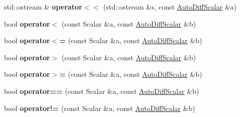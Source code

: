 \begin{DoxyCompactItemize}
\item 
\mbox{\label{class_eigen_1_1_auto_diff_scalar_aaa3efe607e0e4cac21c7ccb1d0f5f800}} 
std\+::ostream \& {\bfseries operator$<$$<$} (std\+::ostream \&s, const \hyperlink{class_eigen_1_1_auto_diff_scalar}{Auto\+Diff\+Scalar} \&a)
\item 
\mbox{\label{class_eigen_1_1_auto_diff_scalar_a7f329201c1c6671fa0bd1aaa1be0e30b}} 
bool {\bfseries operator$<$} (const Scalar \&a, const \hyperlink{class_eigen_1_1_auto_diff_scalar}{Auto\+Diff\+Scalar} \&b)
\item 
\mbox{\label{class_eigen_1_1_auto_diff_scalar_adbe3f187ba731644689b7908c1edbe22}} 
bool {\bfseries operator$<$=} (const Scalar \&a, const \hyperlink{class_eigen_1_1_auto_diff_scalar}{Auto\+Diff\+Scalar} \&b)
\item 
\mbox{\label{class_eigen_1_1_auto_diff_scalar_abf6b293bf812336bd22db1a4d1894751}} 
bool {\bfseries operator$>$} (const Scalar \&a, const \hyperlink{class_eigen_1_1_auto_diff_scalar}{Auto\+Diff\+Scalar} \&b)
\item 
\mbox{\label{class_eigen_1_1_auto_diff_scalar_af1c73c080143c2e35e61c4655bacbb44}} 
bool {\bfseries operator$>$=} (const Scalar \&a, const \hyperlink{class_eigen_1_1_auto_diff_scalar}{Auto\+Diff\+Scalar} \&b)
\item 
\mbox{\label{class_eigen_1_1_auto_diff_scalar_aca029e0c06ceede1858ee90101484d28}} 
bool {\bfseries operator==} (const Scalar \&a, const \hyperlink{class_eigen_1_1_auto_diff_scalar}{Auto\+Diff\+Scalar} \&b)
\item 
\mbox{\label{class_eigen_1_1_auto_diff_scalar_ad4fbf9cab7f13777cab64dc8b262f14b}} 
bool {\bfseries operator!=} (const Scalar \&a, const \hyperlink{class_eigen_1_1_auto_diff_scalar}{Auto\+Diff\+Scalar} \&b)
\item 
\mbox{\label{class_eigen_1_1_auto_diff_scalar_a5fbecd5e2e18e75ebed2a439c662a3a1}} 

\end{DoxyCompactItemize}

